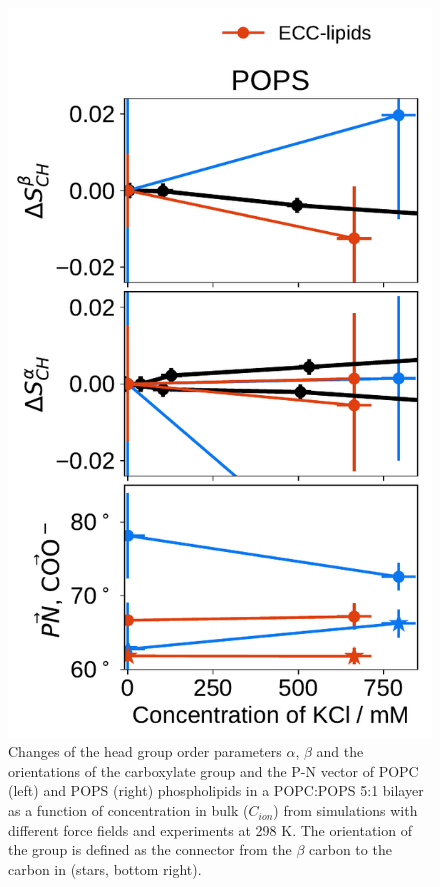 \documentclass[journal=jpcbfk,manuscript=article]{achemso}
\newlength{\figwidth}
\newlength{\figwidthsmall}
\begin{document}
\begin{figure}[tbp!]
  \includegraphics[width=\figwidthsmall]{../img/ecc_pops/order_parameters_changes_ecc-lip_L14_A-B-PN-COO_POPS_kcl.pdf} 
  \caption{\label{fig:delta_ordPar_KCl_PCPS} 
    Changes of the head group order parameters $\alpha$, $\beta$ and the orientations of the carboxylate group and the P-N vector  
    of POPC (left) and POPS (right) phospholipids in a POPC:POPS 5:1 bilayer as a function of  concentration 
    in bulk ($C_{ion}$) from simulations with different force fields and experiments at 298 K. \citep{roux90}
    The orientation of the  group is defined as 
    the connector from the $\beta$ carbon to the carbon in  (stars, bottom right). 
  } 
\end{figure} 
 
\end{document}
